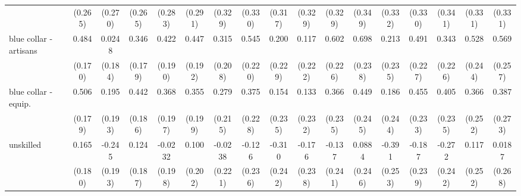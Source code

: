 {\begin{tabular}{l*{16}{c}}
                    &     (0.265)         &     (0.270)         &     (0.265)         &     (0.283)         &     (0.291)         &     (0.329)         &     (0.330)         &     (0.317)         &     (0.329)         &     (0.329)         &     (0.349)         &     (0.332)         &     (0.330)         &     (0.341)         &     (0.331)         &     (0.331)         \\
[1em]
blue collar - artisans&       0.484\sym{**} &      0.0248         &       0.346         &       0.422\sym{*}  &       0.447\sym{*}  &       0.315         &       0.545\sym{*}  &       0.200         &       0.117         &       0.602\sym{**} &       0.698\sym{**} &       0.213         &       0.491\sym{*}  &       0.343         &       0.528\sym{*}  &       0.569\sym{*}  \\
                    &     (0.170)         &     (0.184)         &     (0.179)         &     (0.190)         &     (0.192)         &     (0.208)         &     (0.220)         &     (0.229)         &     (0.222)         &     (0.226)         &     (0.238)         &     (0.235)         &     (0.227)         &     (0.226)         &     (0.244)         &     (0.257)         \\
[1em]
blue collar - equip.&       0.506\sym{**} &       0.195         &       0.442\sym{*}  &       0.368         &       0.355         &       0.279         &       0.375         &       0.154         &       0.133         &       0.366         &       0.449         &       0.186         &       0.455         &       0.405         &       0.366         &       0.387         \\
                    &     (0.179)         &     (0.193)         &     (0.186)         &     (0.197)         &     (0.199)         &     (0.215)         &     (0.228)         &     (0.235)         &     (0.232)         &     (0.235)         &     (0.245)         &     (0.244)         &     (0.233)         &     (0.235)         &     (0.252)         &     (0.273)         \\
[1em]
unskilled           &       0.165         &      -0.245         &       0.124         &     -0.0232         &       0.100         &     -0.0238         &      -0.126         &      -0.310         &      -0.176         &      -0.137         &      0.0884         &      -0.391         &      -0.187         &      -0.272         &       0.117         &      0.0187         \\
                    &     (0.180)         &     (0.193)         &     (0.187)         &     (0.198)         &     (0.202)         &     (0.221)         &     (0.236)         &     (0.242)         &     (0.238)         &     (0.241)         &     (0.246)         &     (0.253)         &     (0.239)         &     (0.242)         &     (0.252)         &     (0.268)         \\

\end{tabular}}
